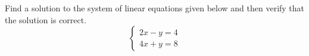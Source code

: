 \documentclass[11pt,letterpaper]{article}
\begin{document}

\problem Find a solution to the system of linear equations given below and then verify that the solution is correct.
	\[
	\begin{cases}
	2x - y= 4 \\
	4x + y= 8
	\end{cases}
	\]
\end{document}
